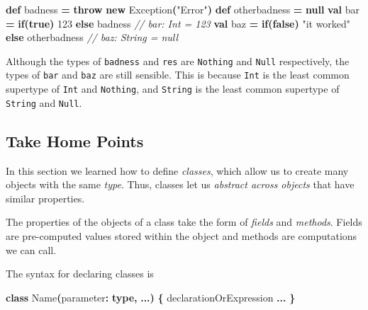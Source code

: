 \documentclass[11pt,a5paper,]{book}
\newenvironment{Shaded}{\begin{snugshade}}{\end{snugshade}}
\newcommand{\CommentTok}[1]{\textcolor[rgb]{0.56,0.35,0.01}{\textit{#1}}}
\newcommand{\ControlFlowTok}[1]{\textcolor[rgb]{0.13,0.29,0.53}{\textbf{#1}}}
\newcommand{\DecValTok}[1]{\textcolor[rgb]{0.00,0.00,0.81}{#1}}
\newcommand{\ExtensionTok}[1]{#1}
\newcommand{\KeywordTok}[1]{\textcolor[rgb]{0.13,0.29,0.53}{\textbf{#1}}}
\newcommand{\NormalTok}[1]{#1}
\newcommand{\OperatorTok}[1]{\textcolor[rgb]{0.81,0.36,0.00}{\textbf{#1}}}
\newcommand{\StringTok}[1]{\textcolor[rgb]{0.31,0.60,0.02}{#1}}
\begin{document}
\begin{Shaded}
\begin{Highlighting}[]
\KeywordTok{def}\NormalTok{ badness }\OperatorTok{=} \ControlFlowTok{throw} \KeywordTok{new} \ExtensionTok{Exception}\OperatorTok{(}\StringTok{"Error"}\OperatorTok{)}
\KeywordTok{def}\NormalTok{ otherbadness }\OperatorTok{=} \KeywordTok{null}
\KeywordTok{val}\NormalTok{ bar }\OperatorTok{=} \ControlFlowTok{if}\OperatorTok{(}\KeywordTok{true}\OperatorTok{)} \DecValTok{123} \ControlFlowTok{else}\NormalTok{ badness}
\CommentTok{// bar: Int = 123}
\KeywordTok{val}\NormalTok{ baz }\OperatorTok{=} \ControlFlowTok{if}\OperatorTok{(}\KeywordTok{false}\OperatorTok{)} \StringTok{"it worked"} \ControlFlowTok{else}\NormalTok{ otherbadness}
\CommentTok{// baz: String = null}
\end{Highlighting}
\end{Shaded}

Although the types of \texttt{badness} and \texttt{res} are
\texttt{Nothing} and \texttt{Null} respectively, the types of
\texttt{bar} and \texttt{baz} are still sensible. This is because
\texttt{Int} is the least common supertype of \texttt{Int} and
\texttt{Nothing}, and \texttt{String} is the least common supertype of
\texttt{String} and \texttt{Null}.

\hypertarget{take-home-points-5}{%
\subsection{Take Home Points}\label{take-home-points-5}}

In this section we learned how to define \emph{classes}, which allow us
to create many objects with the same \emph{type}. Thus, classes let us
\emph{abstract across objects} that have similar properties.

The properties of the objects of a class take the form of \emph{fields}
and \emph{methods}. Fields are pre-computed values stored within the
object and methods are computations we can call.

The syntax for declaring classes is

\begin{Shaded}
\begin{Highlighting}[]
\KeywordTok{class} \ExtensionTok{Name}\OperatorTok{(}\NormalTok{parameter}\OperatorTok{:} \KeywordTok{type}\OperatorTok{,} \OperatorTok{...)} \OperatorTok{\{}
\NormalTok{  declarationOrExpression }\OperatorTok{...}
\OperatorTok{\}}
\end{Highlighting}
\end{Shaded}
\end{document}
